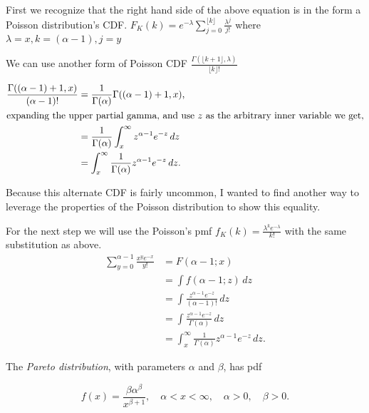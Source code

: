 \documentclass[12pt,letterpaper]{exam}
\begin{document}
\begin{questions}
\begin{solution}
		
		First we recognize that the right hand side of the above equation is in the form a Poisson distribution's CDF.
		\(F_K(k) = e^{-\lambda}\sum_{j=0}^{\lfloor k\rfloor} \frac{\lambda^j}{j!} \)
		where
		\(\lambda = x, k = (\alpha-1), j = y\)
		
		We can use another form of Poisson CDF
		\(\frac{\Gamma(\lfloor k+1\rfloor,\lambda )}{\lfloor k\rfloor!}\)
		
		\begin{align*}
			\frac{\Gamma((\alpha-1)+1,x )}{(\alpha-1)!}
			&= \frac{1}{\Gamma(\alpha)} \Gamma((\alpha-1)+1,x ), \\
			\intertext{expanding the upper partial gamma, and use \(z\) as the arbitrary inner variable we get,}
			&= \frac{1}{\Gamma(\alpha)} \int_{x}^{\infty} z^{\alpha-1} e^{-z} \,dz \\
			&=  \int_{x}^{\infty} \frac{1}{\Gamma(\alpha)} z^{\alpha-1} e^{-z} \,dz.
		\end{align*}
		
		Because this alternate CDF is fairly uncommon, I wanted to find another way to leverage the properties of
		the Poisson distribution to show this equality.
		
		For the next step we will use the Poisson's pmf 
		\(f_K(k) = \frac{\lambda^k e^{-\lambda}}{k!} \) 
		with the same substitution as above.				
		\begin{align*}
			\sum_{y=0}^{\alpha-1} \frac{x^y e^{-x}}{y!}
			&= F(\alpha -1 ; x) \\
			&= \int f(\alpha -1 ; z) \,dz \\
			&= \int \frac{z^{\alpha-1} e^{-z}}{(\alpha-1)!} \,dz \\
			&= \int \frac{z^{\alpha-1} e^{-z}}{\Gamma(\alpha)} \,dz \\
			&= \int_{x}^{\infty} \frac{1}{\Gamma(\alpha)} z^{\alpha-1}e^{-z} \,dz.
		\end{align*}
		
		
	\end{solution}
	
	\setcounter{question}{22}
	\question 
	The \textit{Pareto distribution}, with parameters \(\alpha\) and \(\beta\), has pdf
	
	\[f(x) = \frac{\beta\alpha^\beta}{x^{\beta+1}}, \quad \alpha<x<\infty, \quad \alpha>0, \quad \beta>0.\]
	
\end{questions}
\end{document}
